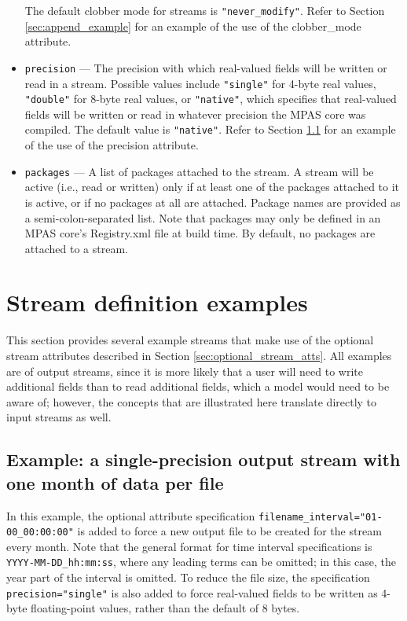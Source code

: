 \begin{itemize}
\begin{itemize}
\end{itemize}
The default clobber mode for streams is {\tt "never\_modify"}. Refer to Section \ref{sec:append_example} for an example of the use of
the clobber\_mode attribute.
\item {\tt precision} --- The precision with which real-valued fields will be written or read in a stream. Possible values include 
{\tt "single"} for 4-byte real values, {\tt "double"} for 8-byte real values, or {\tt "native"}, which specifies that real-valued fields
will be written or read in whatever precision the MPAS core was compiled. The default value is {\tt "native"}. Refer to Section \ref{sec:filename_interval_example}
for an example of the use of the precision attribute.
\item {\tt packages} --- A list of packages attached to the stream. A stream will be active (i.e., read or written) only if at least one of 
the packages attached to it is active, or if no packages at all are attached. Package names are provided as a semi-colon-separated
list. Note that packages may only be defined in an MPAS core's Registry.xml file at build time. By default, no packages are attached
to a stream.
\end{itemize}

\section{Stream definition examples}
\label{sec:stream_example} 

This section provides several example streams that make use of the optional stream attributes described in Section \ref{sec:optional_stream_atts}.
All examples are of output streams, since it is more likely that a user will need to write additional fields than to read additional fields, which a model would need to be aware of; however, the concepts that are illustrated here translate directly to input streams as well.

\subsection{Example: a single-precision output stream with one month of data per file}
\label{sec:filename_interval_example}

In this example, the optional attribute specification {\tt filename\_interval="01-00\_00:00:00"} is added to force a new
output file to be created for the stream every month. Note that the general format for time interval specifications is {\tt YYYY-MM-DD\_hh:mm:ss},
where any leading terms can be omitted; in this case, the year part of the interval is omitted. To reduce the file size, the specification
{\tt precision="single"} is also added to force real-valued fields to be written as 4-byte floating-point values, rather than the default of 8 bytes.

